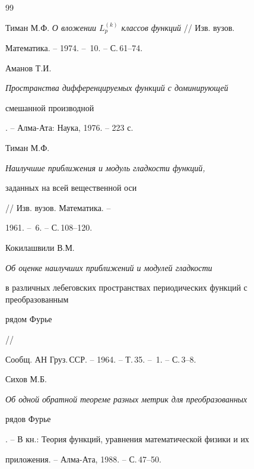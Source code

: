 \begin{thebibliography}{99}


Тиман М.Ф. {\em О вложении $L_p^{(k)}$ классов функций} // Изв. вузов. 


Математика. -- 1974. -- \No\,10. -- С.\,61--74.




Аманов Т.И. {\em Пространства дифференцируемых функций с доминирующей 


смешанной производной}. -- Алма-Ата: Наука, 1976. -- 223 с.




Тиман М.Ф. {\em Наилучшие приближения и модуль гладкости функций, 


заданных на всей вещественной оси} // Изв. вузов. Математика. --


1961. -- \No\,6. -- С.\,108--120.




Кокилашвили В.М. {\em Об оценке наилучших приближений и модулей гладкости


в различных лебеговских пространствах периодических функций с преобразованным 


рядом Фурье} //


Сообщ. АН Груз.\,ССР. -- 1964. -- Т.\,35. -- \No\,1. -- С.\,3--8.




Сихов М.Б. {\em Об одной обратной теореме разных метрик для преобразованных 


рядов Фурье}. -- В кн.: Теория функций, уравнения математической физики и их 


приложения. -- Алма-Ата, 1988. -- С.\,47--50.





\end{thebibliography}





\vskip 2cm














\label{end}


